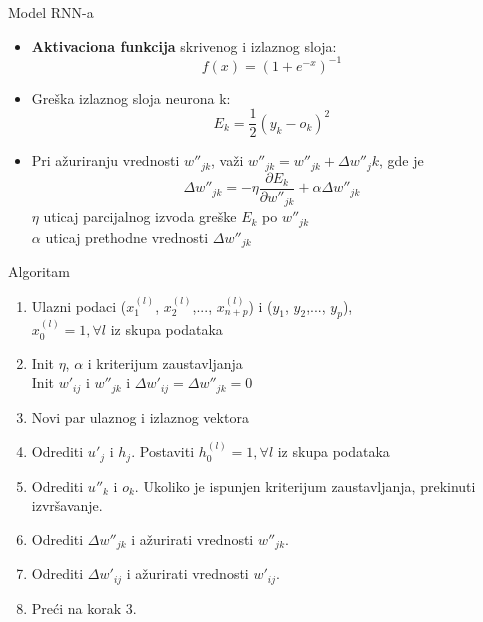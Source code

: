 \documentclass{beamer}
\begin{document}
\begin{frame}{Model RNN-a}
    \begin{itemize}
    \item \textbf{Aktivaciona funkcija} skrivenog i izlaznog sloja:
    $$f(x)=(1+e^{-x})^{-1}$$
    \item Greška izlaznog sloja neurona k: \\
    $$E_k = \frac{1}{2}(y_k - o_k)^2$$
    \item Pri ažuriranju vrednosti $w{''}_{jk}$, važi $w{''}_{jk}=w{''}_{jk}+\Delta{}w{''}_jk$, gde je
$$\Delta{} w{''}_{jk}=- \eta{}\frac{\partial{}E_k}{\partial{}w{''}_{jk}}+\alpha{}\Delta{}w{''}_{jk}$$
    $\eta{}$ uticaj parcijalnog izvoda greške $E_k$ po $w{''}_{jk}$ \\
    $\alpha{}$ uticaj prethodne vrednosti $\Delta{}w{''}_{jk}$
    \end{itemize}
\end{frame}

\begin{frame}{Algoritam}
    \begin{enumerate}
  \item Ulazni podaci ($x^{(l)}_1$, $x^{(l)}_2$,..., $x^{(l)}_{n+p}$) i ($y_1$, $y_2$,..., $y_p$),\\
  $x^{(l)}_0=1, {}\forall{l}$ iz skupa podataka
  \item Init $\eta{}$, $\alpha{}$ i kriterijum zaustavljanja\\
  Init $w'_{ij}$ i $w{''}_{jk}$ i $\Delta{}w'_{ij}=\Delta{}w{''}_{jk}=0$
  \item Novi par ulaznog i izlaznog vektora
  \item Odrediti $u'_j$ i $h_j$. Postaviti $h^{(l)}_0=1, {}\forall{l}$ iz skupa podataka
  \item Odrediti $u{''}_k$ i $o_k$. Ukoliko je ispunjen kriterijum zaustavljanja, prekinuti izvršavanje.
  \item Odrediti $\Delta{}w{''}_{jk}$ i ažurirati vrednosti $w{''}_{jk}$.
  \item Odrediti $\Delta{}w{'}_{ij}$ i ažurirati vrednosti $w{'}_{ij}$.
  \item Preći na korak 3.
\end{enumerate}
\end{frame}

\end{document}
